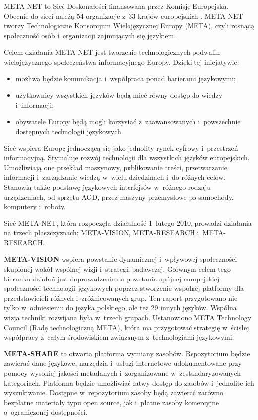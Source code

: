 \begin{multicols}{2} 

META-NET to Sieć Doskonałości finansowana przez Komisję
Europejską. Obecnie do sieci należą 54 organizacje z~33 krajów
europejskich \cite{rehm2011}. META-NET tworzy Technologiczne Konsorcjum
Wielojęzycznej Europy (META), czyli rosnącą społeczność osób
i~organizacji zajmujących się językiem. 

Celem działania META-NET jest tworzenie technologicznych podwalin
wielojęzycznego społeczeństwa informacyjnego Europy. Dzięki tej
inicjatywie: 

\begin{itemize} \item możliwa będzie komunikacja i~współpraca
ponad barierami językowymi; \item użytkownicy wszystkich języków
będą mieć równy dostęp do wiedzy i~informacji; \item obywatele
Europy będą mogli korzystać z~zaawansowanych i~powszechnie
dostępnych technologii językowych. \end{itemize} 

Sieć wspiera Europę jednoczącą się jako jednolity rynek cyfrowy
i~przestrzeń informacyjną. Stymuluje rozwój technologii dla
wszystkich języków europejskich. Umożliwiają one przekład
maszynowy, publikowanie treści, przetwarzanie informacji
i~zarządzanie wiedzą w~wielu dziedzinach i~do różnych celów.
Stanowią także podstawę językowych interfejsów w~różnego
rodzaju urządzeniach, od sprzętu AGD, przez maszyny przemysłowe po
samochody, komputery i~roboty. 

Sieć META-NET, która rozpoczęła działalność 1~lutego 2010,
prowadzi działania na trzech płaszczyznach: META-VISION,
META-RESEARCH i~META-RESEARCH. 

\textbf{META-VISION} wspiera powstanie dynamicznej i~wpływowej
społeczności skupionej wokół wspólnej wizji i~strategii
badawczej. Głównym celem tego kierunku działań jest doprowadzenie
do powstania spójnej europejskiej społeczności technologii
językowych poprzez stworzenie wspólnej platformy dla przedstawicieli
różnych i~zróżnicowanych grup. Ten raport przygotowano nie tylko
w~odniesieniu do języka polskiego, ale też 29 innych języków.
Wspólna wizja techniki rozwijana była w~trzech grupach. Ustanowiono
META Technology Council (Radę technologiczną META), która ma
przygotować strategię w~ścisłej współpracy z~całym
środowiskiem związanym z~technologiami językowymi. 

\textbf{META-SHARE} to otwarta platforma wymiany zasobów.
Repozytorium będzie zawierać dane językowe, narzędzia i~usługi
internetowe udokumentowane przy pomocy wysokiej jakości metadanych
i~zorganizowane w~zestandaryzowanych kategoriach. Platforma będzie
umożliwiać łatwy dostęp do zasobów i~jednolite ich wyszukiwanie.
Dostępne w~repozytorium zasoby będą zawierać zarówno bezpłatne
materiały typu open source, jak i~płatne zasoby komercyjne
o~ograniczonej dostępności. 


\end{multicols}
